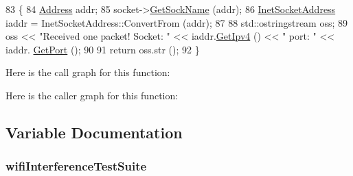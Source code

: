 \begin{DoxyCode}
83 \{
84   \hyperlink{classns3_1_1Address}{Address} addr;
85   socket->\hyperlink{classns3_1_1Socket_aa982ca9baab28bea412b0d9710e63b43}{GetSockName} (addr);
86   \hyperlink{classns3_1_1InetSocketAddress}{InetSocketAddress} iaddr = InetSocketAddress::ConvertFrom (addr);
87 
88   std::ostringstream oss;
89   oss << \textcolor{stringliteral}{"Received one packet!  Socket: "} << iaddr.\hyperlink{classns3_1_1InetSocketAddress_a925d5288448467062884ce0363a63658}{GetIpv4} () << \textcolor{stringliteral}{" port: "} << iaddr.
      \hyperlink{classns3_1_1InetSocketAddress_ac1d62cfd1075b36df273b382c5bd3e14}{GetPort} ();
90 
91   \textcolor{keywordflow}{return} oss.str ();
92 \}
\end{DoxyCode}


Here is the call graph for this function\+:




Here is the caller graph for this function\+:




\subsection{Variable Documentation}
\subsubsection[{\texorpdfstring{wifi\+Interference\+Test\+Suite}{wifiInterferenceTestSuite}}]{ wifi\+Interference\+Test\+Suite\hspace{0.3cm}{\ttfamily [static]}}\hypertarget{wifi-interference-test-suite_8cc_ada63d801df7256f9d90682a2063a2d24}{}\label{wifi-interference-test-suite_8cc_ada63d801df7256f9d90682a2063a2d24}
